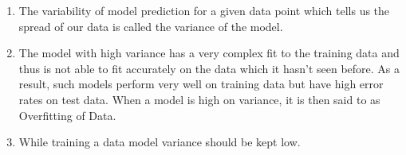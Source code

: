 \begin{enumerate}
    \item The variability of model prediction for a given data point which tells us the spread of our data is called the variance of the model. 
    \hfill \cite{geeksforgeeks/machine-learning/ml-bias-variance-trade-off}
    
    \item The model with high variance has a very complex fit to the training data and thus is not able to fit accurately on the data which it hasn’t seen before. As a result, such models perform very well on training data but have high error rates on test data. When a model is high on variance, it is then said to as Overfitting of Data. 
    \hfill \cite{geeksforgeeks/machine-learning/ml-bias-variance-trade-off}
    
    \item While training a data model variance should be kept low.
    \hfill \cite{geeksforgeeks/machine-learning/ml-bias-variance-trade-off}
\end{enumerate}

























